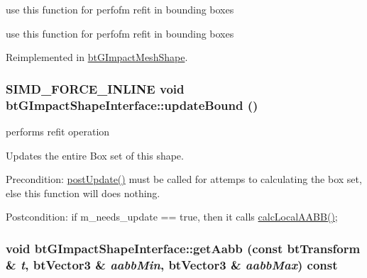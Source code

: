use this function for perfofm refit in bounding boxes 

use this function for perfofm refit in bounding boxes 

Reimplemented in \hyperlink{classbt_g_impact_mesh_shape_a9273d609f4872c7a4c05e9873edbda8}{btGImpactMeshShape}.\hypertarget{classbt_g_impact_shape_interface_cb26c2d7a2aecabd06b996b72b848492}{
\subsubsection[updateBound]{\setlength{\rightskip}{0pt plus 5cm}SIMD\_\-FORCE\_\-INLINE void btGImpactShapeInterface::updateBound ()}}
\label{classbt_g_impact_shape_interface_cb26c2d7a2aecabd06b996b72b848492}


performs refit operation 

Updates the entire Box set of this shape. \begin{Desc}
\item[Precondition:]\hyperlink{classbt_g_impact_shape_interface_c430754948ac92d6f70b81e88416c96a}{postUpdate()} must be called for attemps to calculating the box set, else this function will does nothing. \end{Desc}
\begin{Desc}
\item[Postcondition:]if m\_\-needs\_\-update == true, then it calls \hyperlink{classbt_g_impact_shape_interface_1712a4613e20aa9249514dcd97f0a086}{calcLocalAABB()}; \end{Desc}
\hypertarget{classbt_g_impact_shape_interface_418d1f35f4dd58e4d3195aee639b615b}{
\subsubsection[getAabb]{\setlength{\rightskip}{0pt plus 5cm}void btGImpactShapeInterface::getAabb (const btTransform \& {\em t}, \/  btVector3 \& {\em aabbMin}, \/  btVector3 \& {\em aabbMax}) const}}
\label{classbt_g_impact_shape_interface_418d1f35f4dd58e4d3195aee639b615b}


